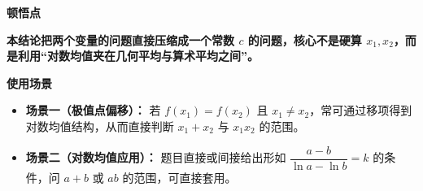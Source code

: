 \begin{explanationbox}
	\medskip
	\textbf{\textcolor{CExplanation}{顿悟点}}

	\textbf{本结论把两个变量的问题直接压缩成一个常数 $c$ 的问题，核心不是硬算 $x_1,x_2$，而是利用“对数均值夹在几何平均与算术平均之间”。}

	\medskip
	\textbf{\textcolor{CExplanation}{使用场景}}
	\begin{itemize}[leftmargin=*, itemsep=0.5em, topsep=0.4em]
		\item \textbf{场景一（极值点偏移）：} 若 $f(x_1)=f(x_2)$ 且 $x_1\neq x_2$，常可通过移项得到对数均值结构，从而直接判断 $x_1+x_2$ 与 $x_1x_2$ 的范围。
		\item \textbf{场景二（对数均值应用）：} 题目直接或间接给出形如 $\dfrac{a-b}{\ln a-\ln b}=k$ 的条件，问 $a+b$ 或 $ab$ 的范围，可直接套用。
	\end{itemize}
\end{explanationbox}